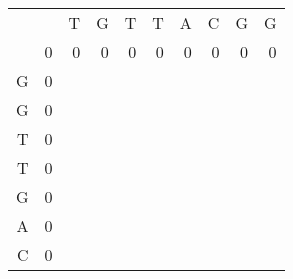 \begin{enumerate}
	\begin{table}[H]
		\centering
		\begin{tabular}{rrrrrrrrrr}
			&                        & T                      & G                      & T                      & T                      & A                      & C                      & G                      & G                      \\ \cline{2-10} 
			\multicolumn{1}{r|}{}  & \multicolumn{1}{r|}{0} & \multicolumn{1}{r|}{0} & \multicolumn{1}{r|}{0} & \multicolumn{1}{r|}{0} & \multicolumn{1}{r|}{0} & \multicolumn{1}{r|}{0} & \multicolumn{1}{r|}{0} & \multicolumn{1}{r|}{0} & \multicolumn{1}{r|}{0} \\ \cline{2-10} 
			\multicolumn{1}{r|}{G} & \multicolumn{1}{r|}{0} & \multicolumn{1}{r|}{}  & \multicolumn{1}{r|}{}  & \multicolumn{1}{r|}{}  & \multicolumn{1}{r|}{}  & \multicolumn{1}{r|}{}  & \multicolumn{1}{r|}{}  & \multicolumn{1}{r|}{}  & \multicolumn{1}{r|}{}  \\ \cline{2-10} 
			\multicolumn{1}{r|}{G} & \multicolumn{1}{r|}{0} & \multicolumn{1}{r|}{}  & \multicolumn{1}{r|}{}  & \multicolumn{1}{r|}{}  & \multicolumn{1}{r|}{}  & \multicolumn{1}{r|}{}  & \multicolumn{1}{r|}{}  & \multicolumn{1}{r|}{}  & \multicolumn{1}{r|}{}  \\ \cline{2-10} 
			\multicolumn{1}{r|}{T} & \multicolumn{1}{r|}{0} & \multicolumn{1}{r|}{}  & \multicolumn{1}{r|}{}  & \multicolumn{1}{r|}{}  & \multicolumn{1}{r|}{}  & \multicolumn{1}{r|}{}  & \multicolumn{1}{r|}{}  & \multicolumn{1}{r|}{}  & \multicolumn{1}{r|}{}  \\ \cline{2-10} 
			\multicolumn{1}{r|}{T} & \multicolumn{1}{r|}{0} & \multicolumn{1}{r|}{}  & \multicolumn{1}{r|}{}  & \multicolumn{1}{r|}{}  & \multicolumn{1}{r|}{}  & \multicolumn{1}{r|}{}  & \multicolumn{1}{r|}{}  & \multicolumn{1}{r|}{}  & \multicolumn{1}{r|}{}  \\ \cline{2-10} 
			\multicolumn{1}{r|}{G} & \multicolumn{1}{r|}{0} & \multicolumn{1}{r|}{}  & \multicolumn{1}{r|}{}  & \multicolumn{1}{r|}{}  & \multicolumn{1}{r|}{}  & \multicolumn{1}{r|}{}  & \multicolumn{1}{r|}{}  & \multicolumn{1}{r|}{}  & \multicolumn{1}{r|}{}  \\ \cline{2-10} 
			\multicolumn{1}{r|}{A} & \multicolumn{1}{r|}{0} & \multicolumn{1}{r|}{}  & \multicolumn{1}{r|}{}  & \multicolumn{1}{r|}{}  & \multicolumn{1}{r|}{}  & \multicolumn{1}{r|}{}  & \multicolumn{1}{r|}{}  & \multicolumn{1}{r|}{}  & \multicolumn{1}{r|}{}  \\ \cline{2-10} 
			\multicolumn{1}{r|}{C} & \multicolumn{1}{r|}{0} & \multicolumn{1}{r|}{}  & \multicolumn{1}{r|}{}  & \multicolumn{1}{r|}{}  & \multicolumn{1}{r|}{}  & \multicolumn{1}{r|}{}  & \multicolumn{1}{r|}{}  & \multicolumn{1}{r|}{}  & \multicolumn{1}{r|}{}  \\ \cline{2-10} 

\end{tabular}
\end{table}
\end{enumerate}
